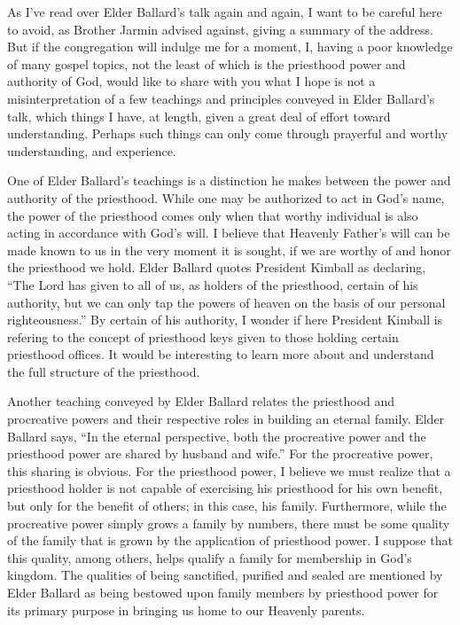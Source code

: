\documentclass[12pt]{article}
\begin{document}
As I've read over Elder Ballard's talk again and again, I want to be careful here to
avoid, as Brother Jarmin advised against, giving a summary of the address.  But if the
congregation will indulge me for a moment, I, having a
poor knowledge of many gospel topics, not the least of which is the priesthood
power and authority of God, would like to share with you what I hope is not
a misinterpretation of a few teachings and principles conveyed in Elder Ballard's talk,
which things I have, at length, given a great deal of effort toward understanding.
Perhaps such things can only come through prayerful and worthy understanding,
and experience.

One of Elder Ballard's teachings is a distinction he makes between the power and
authority of the priesthood.  While one may be authorized to act in God's name,
the power of the priesthood comes only when that worthy individual is also acting in
accordance with God's will.  I believe that Heavenly Father's will can be made known
to us in the very moment it is sought, if we are worthy of and honor the priesthood we hold.
Elder Ballard quotes President Kimball as declaring, ``The Lord has given to all of us, as holders of
the priesthood, certain of his authority, but we can only tap the powers of heaven on the basis
of our personal righteousness.''  By certain of his authority, I wonder if here President Kimball
is refering to the concept of priesthood keys given to those holding certain priesthood offices.
It would be interesting to learn more about and understand the full structure of the priesthood.

Another teaching conveyed by Elder Ballard relates the priesthood and procreative powers
and their respective roles in building an eternal family.  Elder Ballard says, ``In the
eternal perspective, both the procreative power and the priesthood power are shared by husband
and wife.''  
For the procreative power, this sharing is obvious.  For the priesthood power, I believe
we must realize that a priesthood holder is not capable of exercising his priesthood for his own benefit,
but only for the benefit of others; in this case, his family.  Furthermore, while the procreative
power simply grows a family by numbers, there must be some quality of the family that is grown
by the application of priesthood power.  I suppose that this quality, among others, helps qualify a family
for membership in God's kingdom.  The qualities of being sanctified, purified and sealed
are mentioned by Elder Ballard as being bestowed upon family members by priesthood power for
its primary purpose in bringing us home to our Heavenly parents.
\end{document}

